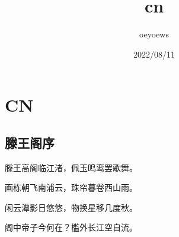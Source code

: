 \documentclass[UTF8]{article}
\title{cn \emoji{rocket}}
\author{oeyoews}
\date{2022/08/11}
\begin{document}
\maketitle

\section{CN}%
\label{sec:CN}

\subsection{滕王阁序}%
\label{sec:滕王阁序}

滕王高阁临江渚，佩玉鸣鸾罢歌舞。

画栋朝飞南浦云，珠帘暮卷西山雨。

闲云潭影日悠悠，物换星移几度秋。

阁中帝子今何在？槛外长江空自流。
\end{document}
